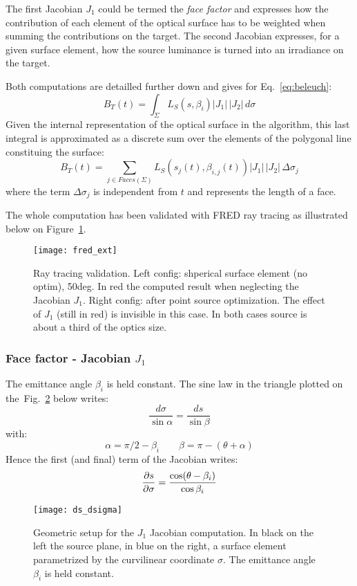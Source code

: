 The first Jacobian $J_1$ could be termed the \textit{face factor}
and expresses how the contribution of each element of the 
optical surface has to be weighted when summing the contributions on the target.
The second Jacobian expresses, for a given surface element,
how the source luminance is turned into an irradiance on the target.

Both computations are detailled further down and gives for Eq.~\eqref{eq:beleuch}:
\[ B_T(t) = \int_\Sigma L_S(s, \beta_i) |J_1| \,|J_2|\, d\sigma \]
Given the internal representation of the optical surface in the 
algorithm, this last integral is approximated as a discrete
sum over the 
elements of the polygonal line constituing the surface:
\begin{equation}
\label{eq:computed_irr}
B_T(t) = \sum_{j \in Faces(\Sigma)} L_S(s_j(t), \beta_{i, j}(t)) 
|J_1| \,|J_2|\,\Delta \sigma_j 
\end{equation} 
where the term $\Delta \sigma_j$ is independent from $t$ and represents the
length of a face.

The whole computation has been validated with FRED ray tracing as illustrated
below on Figure~\ref{fig:fred_ext}.
\begin{figure}
\centering
\texttt{[image: fred\_ext]} 
\caption{Ray tracing validation. Left config: shperical surface element (no optim), 50deg.
In red the computed result when neglecting the Jacobian $J_1$. Right config:
after point source optimization. The effect of $J_1$ (still in red)
 is invisible in this case.
 In both cases source is about a third of the optics size.
}
\label{fig:fred_ext}
\end{figure}

\subsubsection*{Face factor - Jacobian $J_1$}
The emittance angle $\beta_i$ is held constant.
The sine law in the triangle plotted on the~Fig.~\ref{fig:ds_dsigma} below writes:
\[ \frac{d\sigma}{\sin\alpha} = \frac{ds}{\sin\beta}\]
with:
\[ \alpha = \pi/2 - \beta_i \quad \quad \beta = \pi - (\theta+\alpha)\]
Hence the first (and final) term of the Jacobian writes:
\[ \frac{\partial{s}}{\partial{\sigma}} = \frac{\cos(\theta-\beta_i)}{\cos\beta_i} \]

\begin{figure}[!htbp]
\centering
\texttt{[image: ds\_dsigma]} 
\caption{Geometric setup for the $J_1$ Jacobian computation. In black
on the left the source plane, in blue on the right, a surface element parametrized
by the curvilinear coordinate $\sigma$. The emittance angle $\beta_i$ is held constant.}
\label{fig:ds_dsigma}
\end{figure}

